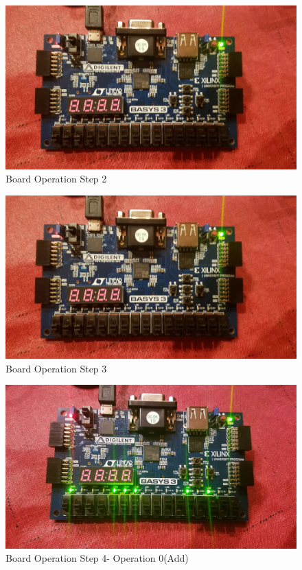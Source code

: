 \documentclass[11pt]{article}
\begin{document}
\begin{figure}[ht]\centering
	\includegraphics[width=1.0\textwidth,trim=0 0mm 0 0,clip]{Step3}
	\caption{Board Operation Step 2}
\end{figure}

\begin{figure}[ht]\centering
	\includegraphics[width=1.0\textwidth,trim=0 0mm 0 0,clip]{Step3}
	\caption{Board Operation Step 3}
\end{figure}

\begin{figure}[ht]\centering
	\includegraphics[width=1.0\textwidth,trim=0 0mm 0 0,clip]{Step4}
	\caption{Board Operation Step 4- Operation 0(Add)}
\end{figure}
\end{document}
